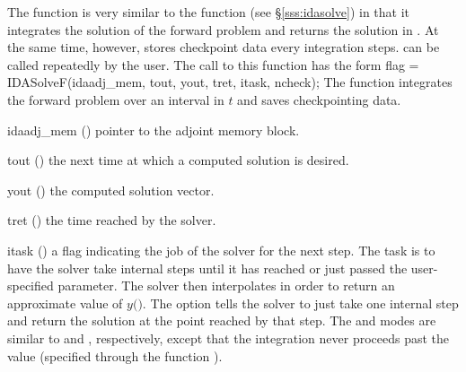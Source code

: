 The function  is very similar to the {\idas} function 
(see \S\ref{sss:idasolve}) in that it integrates the solution of the forward
problem and returns the solution in . At the same time,
however,  stores checkpoint data every  integration steps.
 can be called repeatedly by the user.
The call to this function has the form
{
  flag = IDASolveF(idaadj\_mem, tout, yout, tret, itask, ncheck);
}
{
  The function  integrates the forward problem over an interval in $t$
  and saves checkpointing data.
}
{
  \begin{args}
  \item[idaadj\_mem] ()
    pointer to the adjoint memory block.
  \item[tout] ()
    the next time at which a computed solution is desired.
  \item[yout] ()
    the computed solution vector.
  \item[tret] ()
    the time reached by the solver.
  \item[itask] ()
    a flag indicating the job of the solver for the next step. 
    The  task is to have the solver take internal steps until   
    it has reached or just passed the user-specified 
    parameter. The solver then interpolates in order to   
    return an approximate value of $y($$)$. 
    The  option tells the solver to just take one internal step  
    and return the solution at the point reached by that step. 
    The  and  modes are     
    similar to  and , respectively, except    
    that the integration never proceeds past the value      
     (specified through the function ).
  \end{args}
}
